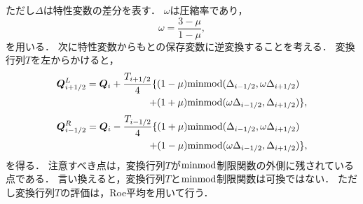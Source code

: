 ただし$\Delta$は特性変数の差分を表す．
$\omega$は圧縮率であり，
\begin{equation}
  \omega=\dfrac{3-\mu}{1-\mu},
\end{equation}
を用いる．
次に特性変数からもとの保存変数に逆変換することを考える．
変換行列$T$を左からかけると，
\begin{equation}
\begin{split}
  {\bm Q}_{i+1/2}^L={\bm Q}_i+\dfrac{T_{i+1/2}}{4} \{ (1- \mu)&{\rm minmod}(\Delta_{i-1/2},\omega \Delta_{i+1/2}) \\
  + (1+ \mu)&{\rm minmod}(\omega \Delta_{i-1/2},\Delta_{i+1/2}) \},
\end{split}
\end{equation}
\begin{equation}
\begin{split}
  {\bm Q}_{i-1/2}^R={\bm Q}_i-\dfrac{T_{i-1/2}}{4} \{ (1+ \mu)&{\rm minmod}(\Delta_{i-1/2},\omega \Delta_{i+1/2}) \\
  + (1- \mu)&{\rm minmod}(\omega \Delta_{i-1/2},\Delta_{i+1/2}) \},
\end{split}
\end{equation}
を得る．
注意すべき点は，変換行列$T$が${\rm minmod}$制限関数の外側に残されている点である．
言い換えると，変換行列$T$と${\rm minmod}$制限関数は可換ではない．
ただし変換行列$T$の評価は，Roe平均\cite{roe1981approximate}を用いて行う．